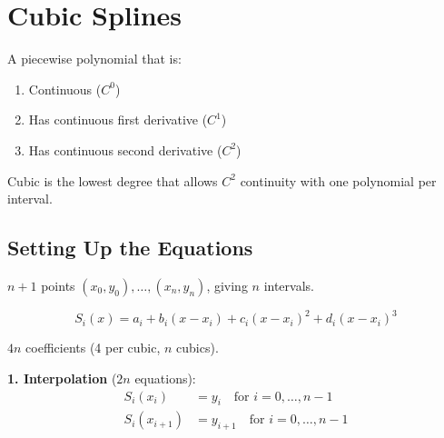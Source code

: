 \newpage
\section{Cubic Splines}

 A piecewise polynomial that is:
\begin{enumerate}
    \item Continuous ($C^0$)
    \item Has continuous first derivative ($C^1$)
    \item Has continuous second derivative ($C^2$)
\end{enumerate}

 Cubic is the lowest degree that allows $C^2$ continuity with one polynomial per interval.

\subsection{Setting Up the Equations}

 $n+1$ points $(x_0, y_0), \ldots, (x_n, y_n)$, giving $n$ intervals.

\begin{equation}
    S_i(x) = a_i + b_i(x - x_i) + c_i(x - x_i)^2 + d_i(x - x_i)^3
\end{equation}

 $4n$ coefficients (4 per cubic, $n$ cubics).



\textbf{1. Interpolation} ($2n$ equations):
\begin{align}
    S_i(x_i) &= y_i \quad \text{for } i = 0, \ldots, n-1 \\
    S_i(x_{i+1}) &= y_{i+1} \quad \text{for } i = 0, \ldots, n-1
\end{align}


